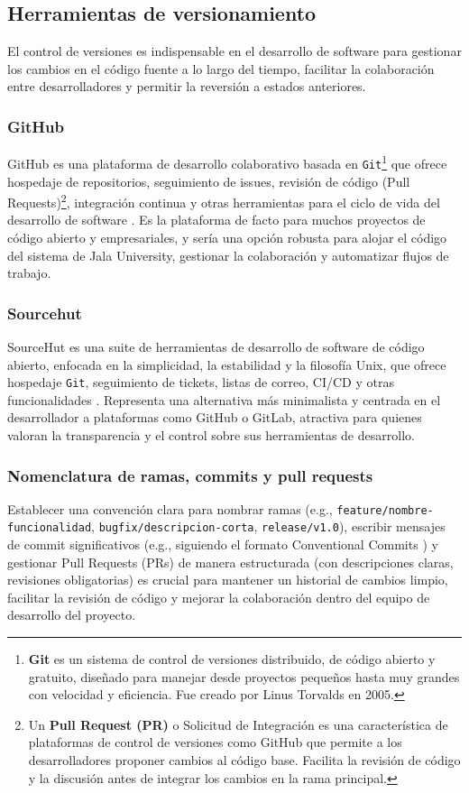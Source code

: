 \subsection{Herramientas de versionamiento}
El control de versiones es indispensable en el desarrollo de software para gestionar los cambios en el código fuente a lo largo del tiempo, facilitar la colaboración entre desarrolladores y permitir la reversión a estados anteriores.

\subsubsection{GitHub}
GitHub es una plataforma de desarrollo colaborativo basada en \texttt{Git}\footnote{\textbf{Git} es un sistema de control de versiones distribuido, de código abierto y gratuito, diseñado para manejar desde proyectos pequeños hasta muy grandes con velocidad y eficiencia.
Fue creado por Linus Torvalds en 2005.} que ofrece hospedaje de repositorios, seguimiento de issues, revisión de código (Pull Requests)\footnote{Un \textbf{Pull Request (PR)} o Solicitud de Integración es una característica de plataformas de control de versiones como GitHub que permite a los desarrolladores proponer cambios al código base.
Facilita la revisión de código y la discusión antes de integrar los cambios en la rama principal.}, integración continua y otras herramientas para el ciclo de vida del desarrollo de software \parencite{GitHub}.
Es la plataforma de facto para muchos proyectos de código abierto y empresariales, y sería una opción robusta para alojar el código del sistema de Jala University, gestionar la colaboración y automatizar flujos de trabajo.

\subsubsection{Sourcehut}
SourceHut es una suite de herramientas de desarrollo de software de código abierto, enfocada en la simplicidad, la estabilidad y la filosofía Unix, que ofrece hospedaje \texttt{Git}, seguimiento de tickets, listas de correo, CI/CD y otras funcionalidades \parencite{SourceHut}.
Representa una alternativa más minimalista y centrada en el desarrollador a plataformas como GitHub o GitLab, atractiva para quienes valoran la transparencia y el control sobre sus herramientas de desarrollo.

\subsubsection{Nomenclatura de ramas, commits y pull requests}
Establecer una convención clara para nombrar ramas (e.g., \texttt{feature/nombre-funcionalidad}, \texttt{bugfix/descripcion-corta}, \texttt{release/v1.0}), escribir mensajes de commit significativos (e.g., siguiendo el formato Conventional Commits \parencite{ConventionalCommits}) y gestionar Pull Requests (PRs) de manera estructurada (con descripciones claras, revisiones obligatorias) es crucial para mantener un historial de cambios limpio, facilitar la revisión de código y mejorar la colaboración dentro del equipo de desarrollo del proyecto.
